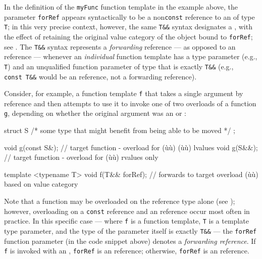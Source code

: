 \noindent In the definition of the \lstinline!myFunc! function template in the example above, the
parameter \lstinline!forRef! appears syntactically to be a
non\lstinline!const! reference to an  of type \lstinline!T!; in
this very precise context, however, the same \lstinline!T&&! syntax
designates a , with the effect of retaining
the original value category of the object bound to \lstinline!forRef!; see .
The \lstinline!T&&! syntax
represents a \emph{forwarding} reference --- as opposed to an
 reference --- whenever an \emph{individual} function template has a type parameter (e.g., \lstinline!T!) and
an unqualified function parameter of type that is exactly
\lstinline!T&&! (e.g., \lstinline!const!~\lstinline!T&&! would be an
 reference, not a forwarding reference).

Consider, for example, a function template \lstinline!f! that takes a single
argument by reference and then attempts to use it to invoke one of two
overloads of a function \lstinline!g!, depending on whether the original
argument was an  or :

\begin{emcppslisting}[emcppsbatch=e1]
struct S { /* some type that might benefit from being able to be moved */ };

void g(const S&);   // target function - overload for (ù{}ù) (ù{}ù) lvalues
void g(S&&);        // target function - overload for (ù{}ù) rvalues only

template <typename T>
void f(T&& forRef); // forwards to target overload (ù{}ù) based on value category
\end{emcppslisting}

\noindent Note that a function may be overloaded on the reference type alone (see ); however, overloading on a \lstinline!const!  reference and an  reference occur most often in practice.
In this specific case --- where \lstinline!f! is a function template,
\lstinline!T! is a template type parameter, and the type of the parameter
itself is exactly \lstinline!T&&! --- the \lstinline!forRef! function
parameter (in the code snippet above) denotes a \emph{forwarding reference}. If \lstinline!f!\label{f-invoked-example}
is invoked with an , \lstinline!forRef! is an 
reference; otherwise, \lstinline!forRef! is an  reference.


